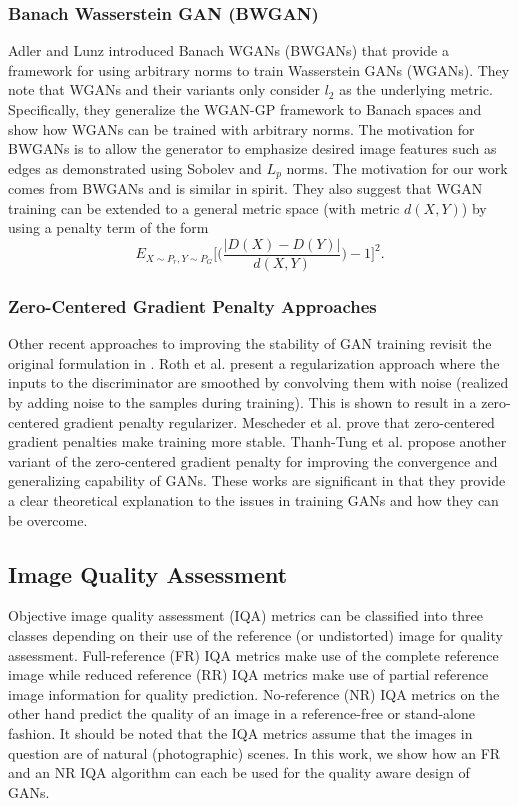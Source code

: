 \documentclass{article}
\begin{document}
\subsubsection{Banach Wasserstein GAN (BWGAN)}
\label{sssec:bwgan}
Adler and Lunz \cite{adler2018banach} introduced
Banach WGANs (BWGANs) that provide a framework for using arbitrary norms to train Wasserstein GANs (WGANs). They note that WGANs and their variants only consider $l_2$ as the underlying metric. Specifically, they generalize the WGAN-GP framework to Banach spaces and show how WGANs can be trained with arbitrary norms.
The motivation for BWGANs is to allow the generator to emphasize desired image features such as edges as demonstrated using Sobolev and $L_p$ norms. The motivation for our work comes from BWGANs and is similar in spirit. They also suggest that WGAN training can be extended to a general metric space (with metric $d(X, Y)$) by using a penalty term of the form
\begin{equation}
   E_{X \sim P_{r},Y \sim P_{G}}\bigg[\bigg(\frac{|D(X)-D(Y)|}{d(X,Y)} \bigg)- 1\bigg]^{2}.
\end{equation}
\subsubsection{Zero-Centered Gradient Penalty Approaches}
\label{sssec:other}
Other recent approaches to improving the stability of GAN training revisit the original formulation in \cite{goodfellow2014generative}. Roth et al. \cite{roth2017stabilizing} present a regularization approach where the inputs to the discriminator are smoothed by convolving them with noise (realized by adding noise to the samples during training). This is shown to result in a zero-centered gradient penalty regularizer. Mescheder et al. \cite{mescheder2018training} prove that zero-centered gradient penalties make training more stable. Thanh-Tung et al. \cite{thanh2019improving} propose another variant of the zero-centered gradient penalty for improving the convergence and generalizing capability of GANs. These works are significant in that they provide a clear theoretical explanation to the issues in training GANs and how they can be overcome.  
\subsection{Image Quality Assessment}
\label{ssec:iqa}
Objective image quality assessment (IQA) metrics can be classified into three classes depending on their use of the reference (or undistorted) image for quality assessment. Full-reference (FR) IQA metrics make use of the complete reference image while reduced reference (RR) IQA metrics make use of partial reference image information for quality prediction. No-reference (NR) IQA metrics on the other hand predict the quality of an image in a reference-free or stand-alone fashion. It should be noted that the IQA metrics assume that the images in question are of natural (photographic) scenes. In this work, we show how an FR and an NR IQA algorithm can each be used for the quality aware design of GANs.
\end{document}
